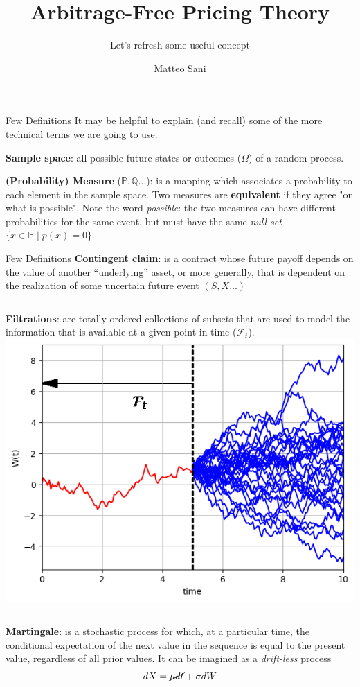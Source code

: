 \documentclass{beamer}
\title{Arbitrage-Free Pricing Theory}
\subtitle{Let's refresh some useful concept}
\author{\href{mailto:matteo.sani@unisi.it}{Matteo Sani}}
\begin{document}
	\begin{frame}[plain]
		\maketitle
	\end{frame}        
	
\begin{frame}{Few Definitions}
		It may be helpful to explain (and recall) some of the more technical terms we are going to use.\newline
		
		\textbf{Sample space}: all possible future states or outcomes ($\Omega$) of a random process.\newline
		
		\textbf{(Probability) Measure} ($\mathbb{P}, \mathbb{Q}\ldots$): is a mapping which associates a probability to each element in the sample space. Two measures are \textbf{equivalent} if they agree "on what is possible". Note the word \emph{possible}: the two measures can have different probabilities for the same event, but must have the same \emph{null-set} $\{x\in {\mathbb{P}}\mid p (x)=0\}$. 
	\end{frame}

\begin{frame}{Few Definitions}
		\textbf{Contingent claim}: is a contract whose future payoff depends on the value of another “underlying” asset, or more generally, that is dependent on the realization of some uncertain future event $(S, X\ldots)$
		
		\begin{columns}
			\textbf{Filtrations}: are totally ordered collections of subsets that are used to model the information that is available at a given point in time ($\mathcal{F}_t$). 
				\includegraphics[width=0.8\linewidth]{filtration}
		\end{columns}
		
		\textbf{Martingale}: is a stochastic process for which, at a particular time, the conditional expectation of the next value in the sequence is equal to the present value, regardless of all prior values. It can be imagined as a \emph{drift-less} process
		\begin{equation*}
			dX = \cancel{\mu dt} + \sigma dW
		\end{equation*}
	\end{frame}
\end{document}
